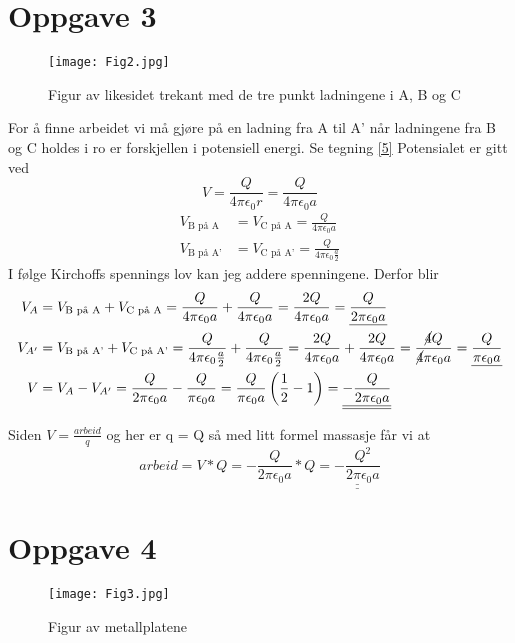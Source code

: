 \documentclass[a4paper,12pt,norsk]{article}
\begin{document}
\section{Oppgave 3}
\begin{figure}[h!]
\texttt{[image: Fig2.jpg]} 
\caption{Figur av likesidet trekant med de tre punkt ladningene i A, B og C}
\label{5}
\end{figure}

For å finne arbeidet vi må gjøre på en ladning fra A til A' når ladningene fra B og C holdes i ro er forskjellen i potensiell energi. Se tegning \vref{5}
Potensialet er gitt ved $$V = \frac{Q}{4 \pi \epsilon_0r} =\frac{Q}{4 \pi \epsilon_0a}$$
\begin{align*}
V_{\text{B på A}} &= V_{\text{C på A}} = \frac{Q}{4 \pi \epsilon_0a}\\
V_{\text{B på A'}} &= V_{\text{C på A'}} = \frac{Q}{4 \pi \epsilon_0\frac{a}{2}}
\end{align*}
I følge Kirchoffs spennings lov kan jeg addere spenningene. Derfor blir 
\begin{align*}
V_{A} &= V_{\text{B på A}} + V_{\text{C på A}} = \frac{Q}{4 \pi \epsilon_0a} + \frac{Q}{4 \pi \epsilon_0a}
= \frac{2Q}{4 \pi \epsilon_0a} = \underline{\frac{Q}{2 \pi \epsilon_0a}}\\
V_{A'} &= V_{\text{B på A'}} + V_{\text{C på A'}} = \frac{Q}{4 \pi \epsilon_0\frac{a}{2}} + \frac{Q}{4 \pi \epsilon_0\frac{a}{2}} = \frac{2Q}{4 \pi \epsilon_0a} + \frac{2Q}{4 \pi \epsilon_0a} = \frac{\cancel{4}Q}{\cancel{4} \pi \epsilon_0a} = \underline{\frac{Q}{\pi \epsilon_0a}}\\
V &= V_A - V_{A'} = \frac{Q}{2 \pi \epsilon_0a} - \frac{Q}{\pi \epsilon_0a} = \frac{Q}{\pi \epsilon_0a}\left(\frac{1}{2} - 1 \right) = \underline{\underline{- \frac{Q}{2\pi \epsilon_0a}}}
\end{align*}

Siden $V = \frac{arbeid}{q}$ og her er q = Q så med litt formel massasje får vi at $$arbeid = V*Q = - \frac{Q}{2\pi \epsilon_0a}*Q =\underline{\underline{ - \frac{Q^2}{2\pi \epsilon_0a}}}$$

\section{Oppgave 4}
\begin{figure}[h!]
\texttt{[image: Fig3.jpg]} 
\caption{Figur av metallplatene }
\label{6}
\end{figure}
\end{document}
